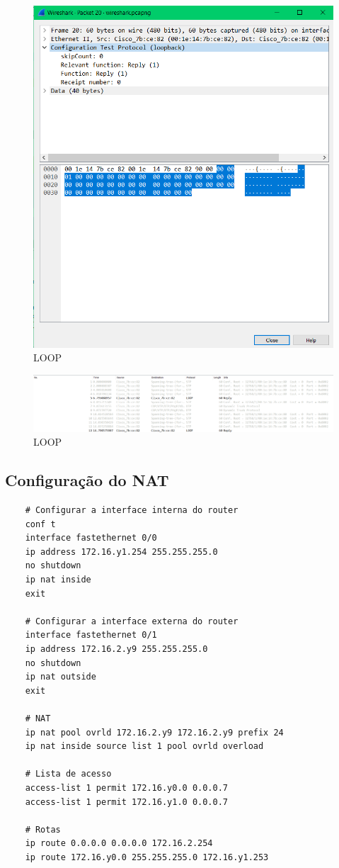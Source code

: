 \documentclass[article, a4paper, 11pt, oneside]{memoir}
\begin{document}
\begin{figure}[h]
	\centering
\includegraphics[scale=0.30]{loopback.png}
\caption{LOOP}
\end{figure}

\begin{figure}[h]
	\centering
\includegraphics[scale=0.45]{loopback-2.png}
\caption{LOOP}
\end{figure}

\newpage
\subsection{Configuração do NAT}
\begin{lstlisting}
	# Configurar a interface interna do router
	conf t 
	interface fastethernet 0/0
	ip address 172.16.y1.254 255.255.255.0 
	no shutdown 
	ip nat inside 
	exit 
	
	# Configurar a interface externa do router
	interface fastethernet 0/1
	ip address 172.16.2.y9 255.255.255.0 
	no shutdown 
	ip nat outside 
	exit 
	
	# NAT
	ip nat pool ovrld 172.16.2.y9 172.16.2.y9 prefix 24 
	ip nat inside source list 1 pool ovrld overload 
	
	# Lista de acesso
	access-list 1 permit 172.16.y0.0 0.0.0.7 
	access-list 1 permit 172.16.y1.0 0.0.0.7 
	
	# Rotas
	ip route 0.0.0.0 0.0.0.0 172.16.2.254 
	ip route 172.16.y0.0 255.255.255.0 172.16.y1.253 
\end{lstlisting}
\end{document}

